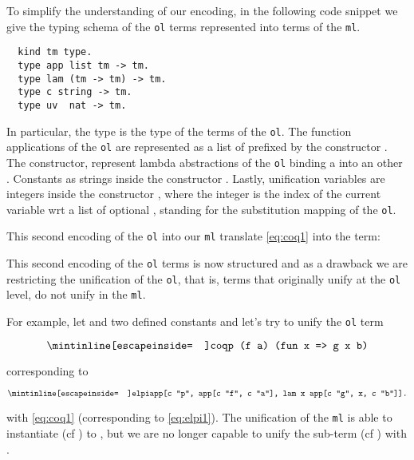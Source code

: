 \documentclass[sigconf,natbib=false]{acmart}
\newcommand*{\acronym}[1]{\texttt{#1}\xspace}
\def\ol{\acronym{ol}} %
\def\ml{\acronym{ml}} %
\begin{document}
To simplify the understanding of our encoding, in the following code snippet
we give the typing schema of the \ol terms represented into terms of the \ml. 

\begin{verbatim}
  kind tm type.
  type app list tm -> tm.
  type lam (tm -> tm) -> tm.
  type c string -> tm.
  type uv  nat -> tm.
\end{verbatim}

In particular, the type  is the type of the terms of the \ol. The
function applications of the \ol are represented as a list of 
prefixed by the constructor . The  constructor,
represent lambda abstractions of the \ol binding a  into an other
. Constants as strings inside the constructor . Lastly,
unification variables are integers inside the constructor , where the
integer is the index of the current variable wrt a list of optional ,
standing for the substitution mapping of the \ol.

This second encoding of the \ol into our \ml translate \cref{eq:coq1} into
the term:


This second encoding of the \ol terms is now structured and as a drawback we are
restricting the unification of the \ol, that is, terms that originally unify
at the \ol level, do not unify in the \ml.

For example, let  and  two defined constants and let's try to
unify the \ol term

\begin{equation}
  \texttt{\coqIn{p (f a) (fun x => g x b)}}
\end{equation}

\noindent corresponding to 

\begin{equation}
  \texttt{\elpiIn{app[c "p", app[c "f", c "a"], lam x\ app[c "g", x, c "b"]].}}
  \label{eq:elpi2}
\end{equation}

\noindent with \cref{eq:coq1} (corresponding to \cref{eq:elpi1}). The
unification of the \ml is able to instantiate  (cf ) to
, but we are no longer capable to unify the sub-term
 (cf ) with . 
\end{document}
